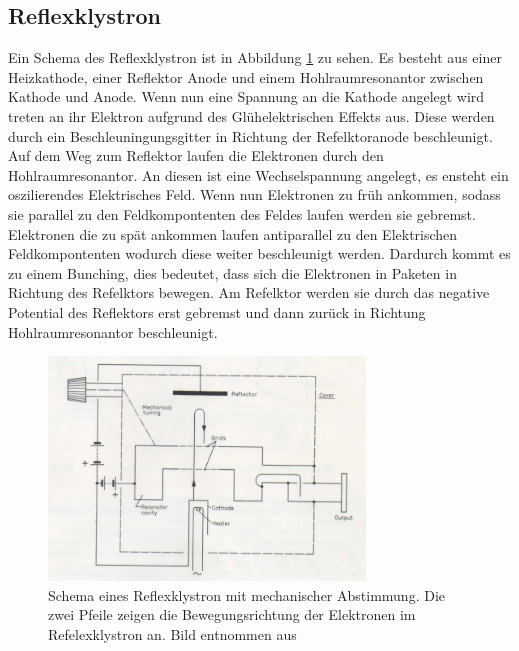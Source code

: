 \subsection{Reflexklystron}
Ein Schema des Reflexklystron ist in Abbildung \ref{fig:reflex_schema} zu sehen.
Es besteht aus einer Heizkathode, einer Reflektor Anode und einem Hohlraumresonantor zwischen Kathode und Anode.
Wenn nun eine Spannung an die Kathode angelegt wird treten an ihr Elektron aufgrund des Glühelektrischen Effekts aus.
Diese werden durch ein Beschleuningungsgitter in Richtung der Refelktoranode beschleunigt.
Auf dem Weg zum Reflektor laufen die Elektronen durch den Hohlraumresonantor.
An diesen ist eine Wechselspannung angelegt, es ensteht ein oszilierendes Elektrisches Feld.
Wenn nun Elektronen zu früh ankommen, sodass sie parallel zu den Feldkompontenten des Feldes laufen werden sie gebremst.
Elektronen die zu spät ankommen laufen antiparallel zu den Elektrischen Feldkompontenten wodurch diese weiter beschleunigt werden.
Dardurch kommt es zu einem Bunching, dies bedeutet, dass sich die Elektronen in Paketen in Richtung des Refelktors bewegen.
Am Refelktor werden sie durch das negative Potential des Reflektors erst gebremst und dann zurück in Richtung Hohlraumresonantor beschleunigt.
\begin{figure}
    \centering
    \includegraphics[width=0.75\textwidth]{content/data/reflex_klystron_schema.png}
    \caption{Schema eines Reflexklystron mit mechanischer Abstimmung. Die zwei Pfeile zeigen die Bewegungsrichtung der Elektronen im Refelexklystron an. Bild entnommen aus \cite[6]{Anleitung}}
    \label{fig:reflex_schema}
\end{figure}
\FloatBarrier

